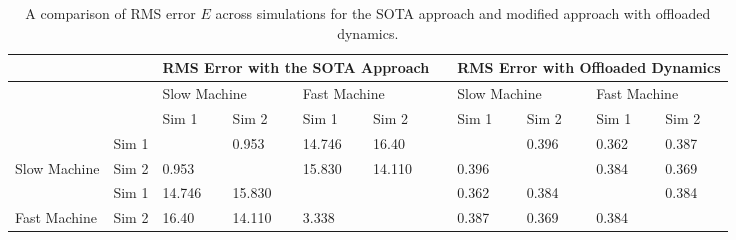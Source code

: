 \documentclass[aps,pra,twocolumn,notitlepage,nofootinbib,superscriptaddress]{revtex4-1}
\begin{document}
\begin{table}[htpb]
\centering
\begin{tabular}{|l|l|llll|l|llll|}
\hline
 &   & \multicolumn{4}{l|}{RMS Error with the SOTA Approach} &   & \multicolumn{4}{l|}{RMS Error with Offloaded Dynamics} \\ \hline
 &   & \multicolumn{2}{l|}{Slow Machine} & \multicolumn{2}{l|}{Fast Machine} &   & \multicolumn{2}{l|}{Slow Machine} & \multicolumn{2}{l|}{Fast Machine} \\ \hline
 &   & \multicolumn{1}{l|}{Sim 1} & \multicolumn{1}{l|}{Sim 2} & \multicolumn{1}{l|}{Sim 1} & Sim 2 &   & \multicolumn{1}{l|}{Sim 1} & \multicolumn{1}{l|}{Sim 2} & \multicolumn{1}{l|}{Sim 1} & Sim 2 \\ \hline
\multicolumn{1}{|c|}{} & Sim 1 & \multicolumn{1}{l|}{} & \multicolumn{1}{l|}{0.953} & \multicolumn{1}{l|}{14.746} & 16.40 &   & \multicolumn{1}{l|}{} & \multicolumn{1}{l|}{0.396} & \multicolumn{1}{l|}{0.362} & 0.387 \\ \cline{2-11} 
\multicolumn{1}{|c|}{\multirow{-2}{*}{Slow Machine}} & Sim 2 & \multicolumn{1}{l|}{0.953} & \multicolumn{1}{l|}{} & \multicolumn{1}{l|}{15.830} & 14.110 &   & \multicolumn{1}{l|}{0.396} & \multicolumn{1}{l|}{} & \multicolumn{1}{l|}{0.384} & 0.369 \\ \hline
 & Sim 1 & \multicolumn{1}{l|}{14.746} & \multicolumn{1}{l|}{15.830} & \multicolumn{1}{l|}{} &   &   & \multicolumn{1}{l|}{0.362} & \multicolumn{1}{l|}{0.384} & \multicolumn{1}{l|}{} & 0.384 \\ \cline{2-11} 
\multirow{-2}{*}{Fast Machine} & Sim 2 & \multicolumn{1}{l|}{16.40} & \multicolumn{1}{l|}{14.110} & \multicolumn{1}{l|}{3.338} &   &   & \multicolumn{1}{l|}{0.387} & \multicolumn{1}{l|}{0.369} & \multicolumn{1}{l|}{0.384} &   \\ \hline
\end{tabular}
\caption{A comparison of RMS error $E$ across simulations for the SOTA approach and modified approach with offloaded dynamics.}
\label{tab:rms_error}
\end{table}
\end{document}
